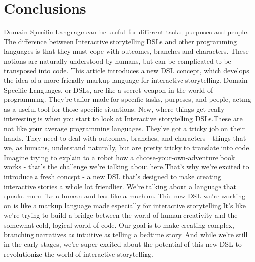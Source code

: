 \chapter*{Conclusions}

Domain Specific Language can be useful for different tasks, purposes and people. The difference between Interactive storytelling DSLs and other programming languages is that they must cope with outcomes, branches and characters. These notions are naturally understood by humans, but can be complicated to be transposed into code. This article introduces a new DSL concept, which develops the idea of a more friendly markup language for interactive storytelling.
Domain Specific Languages, or DSLs, are like a secret weapon in the world of programming. They're tailor-made for specific tasks, purposes, and people, acting as a useful tool for those specific situations. Now, where things get really interesting is when you start to look at Interactive storytelling DSLs.These are not like your average programming languages. They've got a tricky job on their hands. They need to deal with outcomes, branches, and characters - things that we, as humans, understand naturally, but are pretty tricky to translate into code. Imagine trying to explain to a robot how a choose-your-own-adventure book works - that's the challenge we're talking about here.That's why we're excited to introduce a fresh concept - a new DSL that's designed to make creating interactive stories a whole lot friendlier. We're talking about a language that speaks more like a human and less like a machine. This new DSL we're working on is like a markup language made especially for interactive storytelling.It's like we're trying to build a bridge between the world of human creativity and the somewhat cold, logical world of code. Our goal is to make creating complex, branching narratives as intuitive as telling a bedtime story. And while we're still in the early stages, we're super excited about the potential of this new DSL to revolutionize the world of interactive storytelling.

